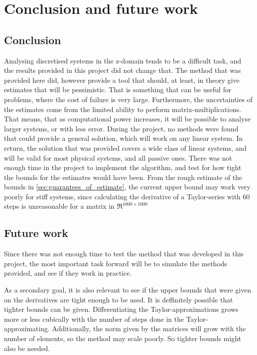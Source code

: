 \chapter{Conclusion and future work}
\label{chp:conclusion}

\section{Conclusion} %
Analysing discretised systems in the z-domain tends to be a difficult task, and the results provided in this project did not change that. The method that was provided here did, however provide a tool that should, at least, in theory give estimates that will be pessimistic. That is something that can be useful for problems, where the cost of failure is very large. Furthermore, the uncertainties of the estimates come from the limited ability to perform matrix-multiplications. That means, that as computational power increases, it will be possible to analyse larger systems, or with less error. During the project, no methods were found that could provide a general solution, which will work on any linear system. In return, the solution that was provided covers a wide class of linear systems, and will be valid for most physical systems, and all passive ones. There was not enough time in the project to implement the algorithm, and test for how tight the bounds for the estimates would have been. From the rough estimate of the bounds in \cref{sec:guarantees_of_estimate}, the current upper bound may work very poorly for stiff systems, since calculating the derivative of a Taylor-series with 60 steps is unreasonable for a matrix in $\Re^{1000\times 1000}$


\section{Future work}
Since there was not enough time to test the method that was developed in this project, the most important task forward will be to simulate the methods provided, and see if they work in practice.

\noindent
As a secondary goal, it is also relevant to see if the upper bounds that were given on the derivatives are tight enough to be used. It is deffinitely possible that tighter bounds can be given. Differentiating the Taylor-approximations grows more or less cubically with the number of steps done in the Taylor-approximating. Additionally, the norm given by the matrices will grow with the number of elements, so the method may scale poorly. So tighter bounds might also be needed. 

